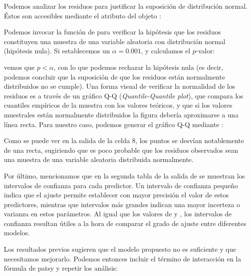 Podemos analizar los residuos para justificar la suposición de distribución normal. Éstos son accesibles mediante el atributo  del objeto :


Podemos invocar la función  de  para verificar la hipótesis que los residuos constituyen una muestra de una variable aleatoria con distribución normal (hipótesis nula). Si establecemos un $\alpha = 0.001$, y calculamos el $p$-valor:


\noindent vemos que $p < \alpha$, con lo que podemos rechazar la hipótesis nula (es decir, podemos concluir que la suposición de que los residuos están normalmente distribuidos no se cumple). Una forma visual de verificar la normalidad de los residuos es a través de un gráfico Q-Q (\textit{Quantile-Quantile plot}), que compara los cuantiles empíricos de la muestra con los valores teóricos, y que si los valores muestrales están normalmente distribuidos la figura debería aproximarse a una línea recta. Para nuestro caso, podemos generar el gráfico Q-Q mediante :


Como se puede ver en la salida de la celda 8, los puntos se desvían notablemente de una recta, sugiriendo que es poco probable que los residuos observados sean una muestra de una variable aleatoria distribuida normalmente.

Por último, mencionamos que en la segunda tabla de la salida de  se muestran los intervalos de confianza para cada predictor. Un intervalo de confianza pequeño indica que el ajuste permite establecer con mayor precisión el valor de estos predictores, mientras que intervalos más grandes indican una mayor incerteza o varianza en estos parámetros. Al igual que los valores de  y , los intervalos de confianza resultan útiles a la hora de comparar el grado de ajuste entre diferentes modelos.

Los resultados previos sugieren que el modelo propuesto no es suficiente y que necesitamos mejorarlo. Podemos entonces incluir el término de interacción en la fórmula de patsy y repetir los análisis:


